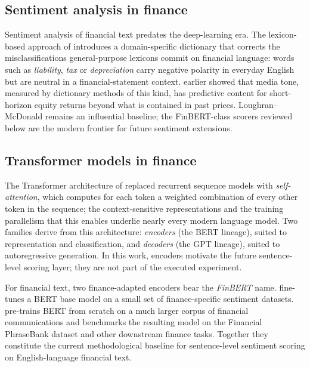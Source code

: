 \subsection{Sentiment analysis in finance} \label{subsec:sentiment-finance}

Sentiment analysis of financial text predates the deep-learning era. The lexicon-based approach of  introduces a domain-specific dictionary that corrects the misclassifications general-purpose lexicons commit on financial language: words such as \textit{liability}, \textit{tax} or \textit{depreciation} carry negative polarity in everyday English but are neutral in a financial-statement context.  earlier showed that media tone, measured by dictionary methods of this kind, has predictive content for short-horizon equity returns beyond what is contained in past prices. Loughran--McDonald remains an influential baseline; the FinBERT-class scorers reviewed below are the modern frontier for future sentiment extensions.

\subsection{Transformer models in finance} \label{subsec:transformers-finance}%
\label{subsec:fin-nlp}\label{subsec:llms}%

The Transformer architecture of  replaced recurrent sequence models with \textit{self-attention}, which computes for each token a weighted combination of every other token in the sequence; the context-sensitive representations and the training parallelism that this enables underlie nearly every modern language model. Two families derive from this architecture: \textit{encoders} (the BERT lineage), suited to representation and classification, and \textit{decoders} (the GPT lineage), suited to autoregressive generation. In this work, encoders motivate the future sentence-level scoring layer; they are not part of the executed experiment.

For financial text, two finance-adapted encoders bear the \textit{FinBERT} name.  fine-tunes a BERT base model on a small set of finance-specific sentiment datasets.  pre-trains BERT from scratch on a much larger corpus of financial communications and benchmarks the resulting model on the Financial PhraseBank dataset and other downstream finance tasks. Together they constitute the current methodological baseline for sentence-level sentiment scoring on English-language financial text.

